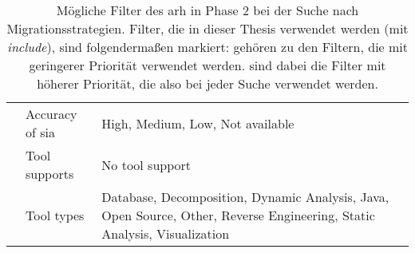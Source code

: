 \begin{table}
\begin{tabular}{m{2cm} m{2cm} m{9cm}}
    & Accuracy of \gls{sia} & High, Medium, Low, Not available \\ \cline{2-3}
    & Tool supports &  No tool support \\ \cline{2-3}
    & Tool types & Database, Decomposition, Dynamic Analysis, Java, Open Source, Other, Reverse Engineering, Static Analysis, Visualization \\
    \bottomrule
  \end{tabular}
  \caption[Mögliche Filter des \gls{arh} in Phase 2]{
  	Mögliche Filter des \gls{arh} in Phase 2 bei der Suche nach Migrationsstrategien.
  	Filter, die in dieser Thesis verwendet werden (mit \emph{include}), sind folgendermaßen markiert:
     gehören zu den Filtern, die mit geringerer Priorität verwendet werden.
     sind dabei die Filter mit höherer Priorität, die also bei jeder Suche verwendet werden.
  }
  \label{tab:phase2-filter}
\end{table}
